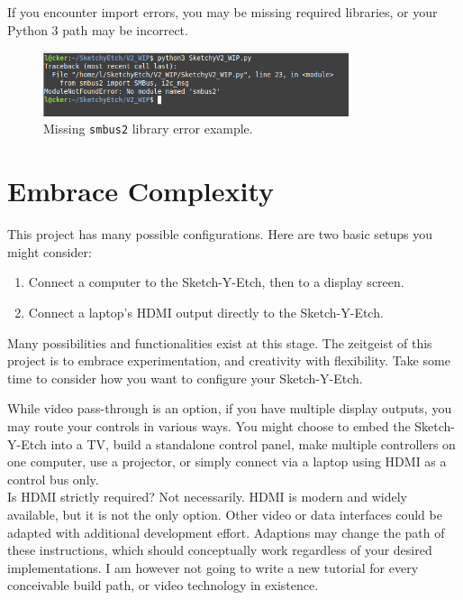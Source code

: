 \documentclass[]{article}
\begin{document}
If you encounter import errors, you may be missing required libraries, or your Python 3 path may be incorrect.

\begin{figure}[ht]
	\centering
	\includegraphics[width=0.8\textwidth]{missing.png}
	\caption{Missing \texttt{smbus2} library error example.}
	\label{fig:missing_smbus2}
\end{figure}

\section*{Embrace Complexity}

This project has many possible configurations. Here are two basic setups you might consider:

\begin{enumerate}
	\item Connect a computer to the Sketch-Y-Etch, then to a display screen.
	\item Connect a laptop's HDMI output directly to the Sketch-Y-Etch.
\end{enumerate}

Many possibilities and functionalities exist at this stage. The zeitgeist of this project is to embrace experimentation, and creativity with flexibility. Take some time to consider how you want to configure your Sketch-Y-Etch.

While video pass-through is an option, if you have multiple display outputs, you may route your controls in various ways. You might choose to embed the Sketch-Y-Etch into a TV, build a standalone control panel, make multiple controllers on one computer, use a projector, or simply connect via a laptop using HDMI as a control bus only.\\

Is HDMI strictly required? Not necessarily. HDMI is modern and widely available, but it is not the only option. Other video or data interfaces could be adapted with additional development effort. Adaptions may change the path of these instructions, which should conceptually work regardless of your desired implementations. I am however not going to write a new tutorial for every conceivable build path, or video technology in existence. \\
\end{document}

